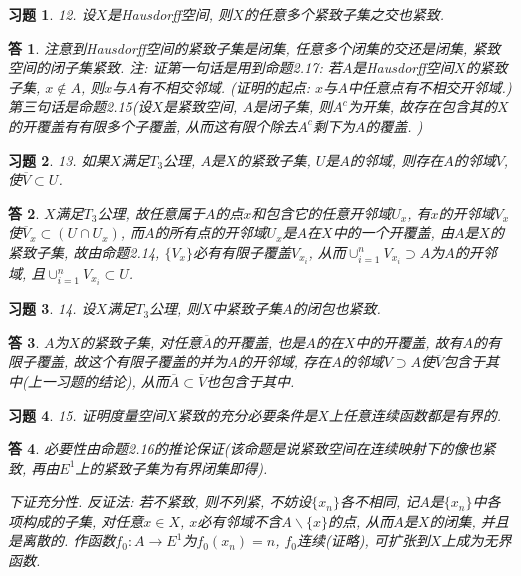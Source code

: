 \documentclass{ctexart}%
\newtheorem*{exercise}{习题}
\newtheorem*{solution}{答}
\theoremstyle{definition}
\theoremstyle{remark}
\begin{document}
\begin{exercise}12. 设$X$是Hausdorff空间, 则$X$的任意多个紧致子集之交也紧致.
\end{exercise}
\begin{solution}
注意到Hausdorff空间的紧致子集是闭集, 任意多个闭集的交还是闭集, 紧致空间的闭子集紧致.
注: 证第一句话是用到命题2.17: 若$A$是Hausdorff空间$X$的紧致子集, $x\notin A$, 则$x$与$A$有不相交邻域. (证明的起点: $x$与$A$中任意点有不相交开邻域.) 第三句话是命题2.15(设$X$是紧致空间, $A$是闭子集, 则$A^c$为开集, 故存在包含其的$X$的开覆盖有有限多个子覆盖, 从而这有限个除去$A^c$剩下为$A$的覆盖. )
\end{solution}

\begin{exercise}13. 如果$X$满足$T_3$公理, $A$是$X$的紧致子集, $U$是$A$的邻域, 则存在$A$的邻域$V$, 使$\overline{V}\subset U$.
\end{exercise}
\begin{solution}
$X$满足$T_3$公理, 故任意属于$A$的点$x$和包含它的任意开邻域$U_x$, 有$x$的开邻域$V_x$使$\overline{V}_x\subset (U\cap U_x)$, 而$A$的所有点的开邻域$U_x$是$A$在$X$中的一个开覆盖, 由$A$是$X$的紧致子集, 故由命题2.14, $\{V_x\}$必有有限子覆盖$V_{x_i}$, 从而$\cup_{i=1}^n V_{x_i}\supset A$为$A$的开邻域, 且$\cup_{i=1}^n V_{x_i}\subset U$. 
\end{solution}

\begin{exercise}14. 设$X$满足$T_3$公理, 则$X$中紧致子集$A$的闭包也紧致.
\end{exercise}
\begin{solution}
$A$为$X$的紧致子集, 对任意$\overline{A}$的开覆盖, 也是$A$的在$X$中的开覆盖, 故有$A$的有限子覆盖, 故这个有限子覆盖的并为$A$的开邻域, 存在$A$的邻域$V\supset A$使$\overline{V}$包含于其中(上一习题的结论), 从而$\overline{A}\subset \overline{V}$也包含于其中. 
\end{solution}

\begin{exercise}15. 证明度量空间$X$紧致的充分必要条件是$X$上任意连续函数都是有界的.
\end{exercise}
\begin{solution}必要性由命题2.16的推论保证(该命题是说紧致空间在连续映射下的像也紧致, 再由$E^1$上的紧致子集为有界闭集即得).

下证充分性. 反证法: 若不紧致, 则不列紧, 不妨设$\{x_n\}$各不相同, 记$A$是$\{x_n\}$中各项构成的子集, 对任意$x\in X$, $x$必有邻域不含$A\backslash\{x\}$的点, 从而$A$是$X$的闭集, 并且是离散的. 作函数$f_0: A\rightarrow E^1$为$f_0(x_n)=n$, $f_0$连续(证略), 可扩张到$X$上成为无界函数. 
\end{solution}
\end{document}

